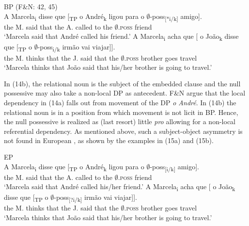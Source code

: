 \documentclass[output=paper]{langsci/langscibook}
\begin{document}
\ea%
    BP (F\&N: 42, 45)\label{ex:wein:14}\\
    \ea
    \gll A Marcela\textsubscript{i} disse que [\textsubscript{TP} o André\textsubscript{k} ligou para o $\emptyset$-poss\textsubscript{[}\textsubscript{*i/k]} amigo].\\
         the M. said that {} the A. called to the $\emptyset$\textsc{.poss} friend\\
    \glt ‘Marcela said that André called his friend.’
    \ex  
    \gll A Marcela\textsubscript{i} acha que [ o João\textsubscript{k} disse que [\textsubscript{TP} o $\emptyset$-poss\textsubscript{i/k} irmão vai viajar]].\\
         the M. thinks that {} the J. said that {} the $\emptyset$\textsc{.poss} brother goes travel\\
    \glt ‘Marcela thinks that João said that his/her brother is going to travel.’
    \z
\z

In (14b), the relational noun is the subject of the embedded clause and the null possessive may also take a non-local DP as antecedent. F\&N argue that the local dependency in (14a) falls out from movement of the DP \textit{o André}. In (14b) the relational noun is in a position from which movement is not licit in BP. Hence, the null possessive is realized as (last resort) little \textit{pro} allowing for a non-local referential dependency. As mentioned above, such a subject-object asymmetry is not found in European , as shown by the examples in (15a) and (15b).

\ea%
    EP\label{ex:wein:15}\\
    \ea
    \gll A Marcela\textsubscript{i} disse que [\textsubscript{TP} o André\textsubscript{k} ligou para o $\emptyset$-poss\textsubscript{[}\textsubscript{i/k]} amigo].\\
         the M. said that {} the A. called to the $\emptyset$\textsc{.poss} friend\\
    \glt ‘Marcela said that André called his/her friend.’
    \ex  
    \gll A Marcela\textsubscript{i} acha que [ o João\textsubscript{k} disse que [\textsubscript{TP} o $\emptyset$-poss\textsubscript{[}\textsubscript{?i/k]} irmão vai viajar]].\\
         the M. thinks that {} the J. said that {} the $\emptyset$\textsc{.poss} brother goes travel\\
    \glt ‘Marcela thinks that João said that his/her brother is going to travel.’
    \z
\z
\end{document}
